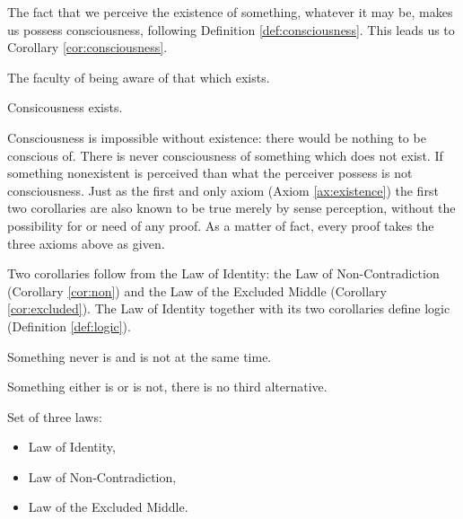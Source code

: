         The fact that we perceive the existence of something, whatever it may be, makes us possess consciousness, following Definition \ref{def:consciousness}. This leads us to Corollary \ref{cor:consciousness}.
        
            \begin{definition}[Consciousness]
            \label{def:consciousness}
                The faculty of being aware of that which exists.
            \end{definition}
            
            \begin{corollary}[Consciousness]
            \label{cor:consciousness}
                Consicousness exists.
            \end{corollary}
            
        Consciousness is impossible without existence: there would be nothing to be conscious of. There is never consciousness of something which does not exist. If something nonexistent is perceived than what the perceiver possess is not consciousness. Just as the first and only axiom (Axiom \ref{ax:existence}) the first two corollaries are also known to be true merely by sense perception, without the possibility for or need of any proof. As a matter of fact, every proof takes the three axioms above as given.
        
        Two corollaries follow from the Law of Identity: the Law of Non-Contradiction (Corollary \ref{cor:non}) and the Law of the Excluded Middle (Corollary \ref{cor:excluded}). The Law of Identity together with its two corollaries define logic (Definition \ref{def:logic}).
            
            \begin{corollary}
            \label{cor:non}
                Something never is and is not at the same time.
            \end{corollary}
            
            \begin{corollary}
            \label{cor:excluded}
                Something either is or is not, there is no third alternative.
            \end{corollary}

            \begin{definition}[Logic]
            \label{def:logic}
                Set of three laws:
                \begin{itemize}
                    \item Law of Identity,
                    \item Law of Non-Contradiction,
                    \item Law of the Excluded Middle.
                \end{itemize}
            \end{definition}
            
